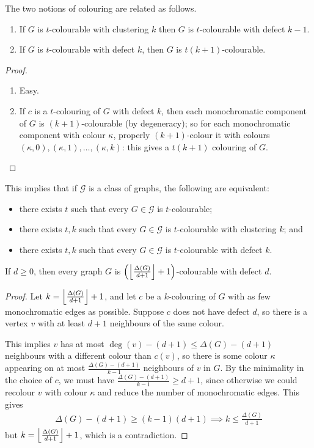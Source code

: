 \documentclass[main.tex]{subfiles}
\begin{document}
The two notions of colouring are related as follows.
\begin{proposition}
  \listhack
  \begin{enumerate}[label=(\arabic*)]
    \item If $G$ is $t$-colourable with clustering $k$ then $G$ is
      $t$-colourable with defect $k-1$.

    \item If $G$ is $t$-colourable with defect $k$,
      then $G$ is $t(k+1)$-colourable.
  \end{enumerate}
\end{proposition}
\begin{proof}
  \leavevmode\vspace{-0.5em}
  \begin{enumerate}[label=(\arabic*)]
    \item Easy.

    \item If $c$ is a $t$-colouring of $G$ with defect $k$,
      then each monochromatic component of $G$ is $(k+1)$-colourable
      (by degeneracy); so for each monochromatic component with colour $\kappa$,
      properly $(k+1)$-colour it with colours
      $(\kappa, 0), (\kappa, 1), \ldots, (\kappa, k)$: this gives a $t(k+1)$
      colouring of $G$. \qedhere
  \end{enumerate}
\end{proof}
This implies that if $\mathcal G$ is a class of graphs, the following are equivalent:
\begin{itemize}
  \item there exists $t$ such that every $G\in\mathcal G$ is $t$-colourable;
  \item there exists $t,k$ such that every $G\in\mathcal G$ is $t$-colourable
    with clustering $k$; and
  \item there exists $t,k$ such that every $G\in\mathcal G$ is $t$-colourable
    with defect $k$.
\end{itemize}
\begin{theorem}
  If $d\geq 0$, then every graph $G$ is
  $\left(\left\lfloor \frac{\Delta(G)}{d+1} \right\rfloor+1\right)$-colourable with defect $d$.
\end{theorem}
\begin{proof}
  Let $k = \left\lfloor \frac{\Delta(G)}{d+1} \right\rfloor+1$, and let $c$ be a $k$-colouring of
  $G$ with as few monochromatic edges as possible.
  Suppose $c$ does not have defect $d$, so there is a vertex $v$ with at least
  $d+1$ neighbours of the same colour.

  This implies $v$ has at most $\deg(v) - (d+1)\leq\Delta(G) - (d+1)$ neighbours
  with a different colour than $c(v)$, so there is some colour $\kappa$
  appearing on at most $\frac{\Delta(G) - (d+1)}{k-1}$ neighbours of $v$ in $G$.
  By the minimality in the choice of $c$, we must have
  $\frac{\Delta(G)-(d+1)}{k-1}\geq d+1$, since otherwise we could recolour $v$
  with colour $\kappa$ and reduce the number of monochromatic edges.
  This gives
  \begin{align*}
    \Delta(G) - (d+1)\geq(k-1)(d+1)\implies k\leq\frac{\Delta(G)}{d+1}
  \end{align*}
  but $k = \left\lfloor \frac{\Delta(G)}{d+1} \right\rfloor+1$, which is a contradiction.
\end{proof}
\end{document}
